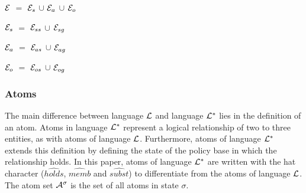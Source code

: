 \documentclass[11pt]{report}
\newenvironment{vquote}
{
  \begin{list}{}{\leftmargin 1em}\item[]
}
{
  \end{list}
}
\begin{document}
          \begin{vquote}
            ${\cal E}$ $=$
            ${\cal E}_{s}$ $\cup$ ${\cal E}_{a}$ $\cup$ ${\cal E}_{o}$

            ${\cal E}_{s}$ $=$ ${\cal E}_{ss}$ $\cup$ ${\cal E}_{sg}$

            ${\cal E}_{a}$ $=$ ${\cal E}_{as}$ $\cup$ ${\cal E}_{ag}$

            ${\cal E}_{o}$ $=$ ${\cal E}_{os}$ $\cup$ ${\cal E}_{og}$
          \end{vquote}

        \subsubsection{Atoms}

          The main difference between language ${\cal L}$ and language
          ${\cal L}^{*}$ lies in the definition of an atom. Atoms in language
          ${\cal L}^{*}$ represent a logical relationship of two to three
          entities, as with atoms of language ${\cal L}$. Furthermore, atoms
          of language ${\cal L}^{*}$ extends this definition by defining the
          state of the policy base in which the relationship holds. In this
          paper, atoms of language ${\cal L}^{*}$ are written with the
          hat character ($\hat{holds}$, $\hat{memb}$ and $\hat{subst}$) to
          differentiate from the atoms of language ${\cal L}$. The atom set
          ${\cal A}^{\sigma}$ is the set of all atoms in state $\sigma$.
\end{document}

